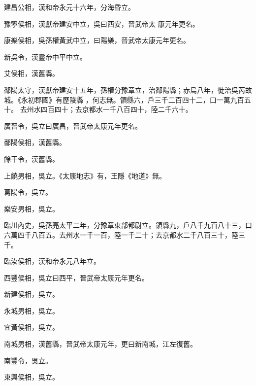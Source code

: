 \begin{pinyinscope}
 建昌公相，漢和帝永元十六年，分海昏立。



 豫寧侯相，漢獻帝建安中立，吳曰西安，晉武帝太
 康元年更名。



 康樂侯相，吳孫權黃武中立，曰陽樂，晉武帝太康元年更名。



 新吳令，漢靈帝中平中立。



 艾侯相，漢舊縣。


鄱陽太守，漢獻帝建安十五年，孫權分豫章立，治鄱陽縣；赤烏八年，徙治吳芮故城。《永初郡國》有歷陵縣
 ，何志無。領縣六，戶三千二百四十二，口一萬九百五十。
 去州水四百四十；去京都水一千八百四十，陸二千六十。



 廣晉令，吳立曰廣昌，晉武帝太康元年更名。



 鄱陽侯相，漢舊縣。



 餘干令，漢舊縣。



 上饒男相，吳立。《太康地志》有，王隱《地道》無。



 葛陽令，吳立。



 樂安男相，吳立。



 臨川內史，吳孫亮太平二年，分豫章東部都尉立。領縣九，戶八千九百八十三，口六萬四千八百五。去州水一千一百，陸一千二十；去京都水二千八百三十，陸三千。



 臨汝侯相，漢和帝永元八年立。



 西豐侯相，吳立曰西平，晉武帝太康元年更名。



 新建侯相，吳立。



 永城男相，吳立。



 宜黃侯相，吳立。



 南城男相，漢舊縣，晉武帝太康元年，更曰新南城，江左復舊。



 南豐令，吳立。



 東興侯相，吳立。




\end{pinyinscope}

